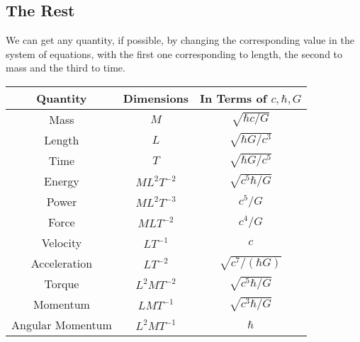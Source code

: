 \documentclass[12pt]{article}
\begin{document}
\subsection{The Rest}
We can get any quantity, if possible, by changing the corresponding value in the system of equations, with the first one corresponding to length, the second to mass and the third to time.
\begin{table}[H]
  \centering
  \begin{tabular}{c|c|c}
    Quantity & Dimensions & In Terms of $c,\hbar,G$ \\ \hline
    Mass             & $M$           & $\sqrt{\hbar c/G}$\\
    Length           & $L$           & $\sqrt{\hbar G/c^3}$\\
    Time             & $T$           & $\sqrt{\hbar G/c^5}$\\
    Energy           & $ML^2T^{-2}$  & $\sqrt{c^5\hbar/G}$\\
    Power            & $ML^2T^{-3}$  & $c^5/G$\\
    Force            & $MLT^{-2}$    & $c^4/G$\\
    Velocity         & $LT^{-1}$     & $c$\\
    Acceleration     & $LT^{-2}$     & $\sqrt{c^7/(\hbar G)}$\\
    Torque           & $L^2MT^{-2}$  & $\sqrt{c^5\hbar/G}$\\
    Momentum         & $LMT^{-1}$    & $\sqrt{c^3\hbar/G}$\\
    Angular Momentum & $L^2MT^{-1}$  & $\hbar$
  \end{tabular}
\end{table}
\end{document}
